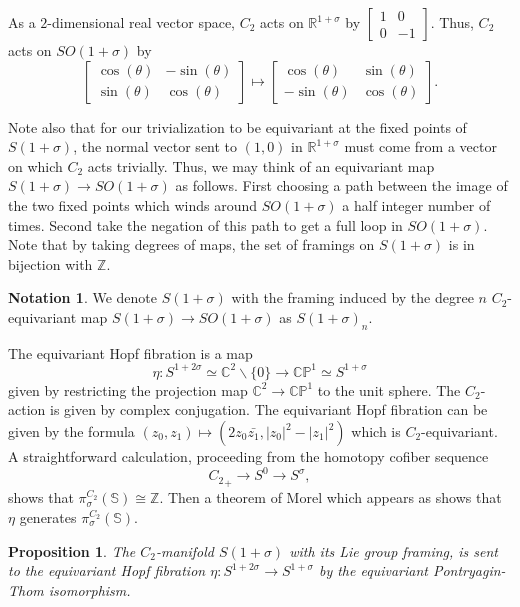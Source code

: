 \documentclass[11pt]{amsart}
\newcommand{\R}{\mathbb R}
\newcommand{\C}{\mathbb C}
\newcommand{\Z}{\mathbb{Z}}
\newcommand{\Sph}{\mathbb{S}}
\theoremstyle{plain}   %
\newtheorem{prop}[thm]{Proposition}
\theoremstyle{definition}
\newtheorem{notn}[thm]{Notation}
\theoremstyle{remark}
\numberwithin{equation}{section}
\begin{document}
As a $2$-dimensional real vector space, $C_2$ acts on $\R^{1+\sigma}$ by $\begin{bmatrix}
1&0\\0&-1
\end{bmatrix}$. Thus, $C_2$ acts on $SO(1+\sigma)$ by 
\[
\begin{bmatrix}
\cos(\theta)&-\sin(\theta)\\\sin(\theta)&\cos(\theta)
\end{bmatrix}\mapsto \begin{bmatrix}\cos(\theta) &\sin(\theta)\\
-\sin(\theta) & \cos(\theta)
\end{bmatrix}.
\]

Note also that for our trivialization to be equivariant at the fixed points of $S(1+\sigma)$, the normal vector sent to $(1,0)$ in $\R^{1+\sigma}$ must come from a vector on which $C_2$ acts trivially. Thus, we may think of an equivariant map $S(1+\sigma)\to SO(1+\sigma)$ as follows. First choosing a path between the image of the two fixed points which winds around $SO(1+\sigma)$ a half integer number of times. Second take the negation of this path to get a full loop in $SO(1+\sigma)$. Note that by taking degrees of maps, the set of framings on $S(1+\sigma)$ is in bijection with $\Z$. 

\begin{notn}
We denote $S(1+\sigma)$ with the framing induced by the degree $n$ $C_2$-equivariant map $S(1+\sigma)\to SO(1+\sigma)$ as $S(1+\sigma)_n$.
\end{notn}

The equivariant Hopf fibration is a map 
\[
\eta\colon S^{1+2\sigma} \simeq \C^2\backslash \{0\} \rightarrow \mathbb{CP}^1\simeq S^{1+\sigma} 
\] 
given by restricting the projection map $\C^2\to \mathbb{CP}^1$ to the unit sphere. The $C_2$-action is given by complex conjugation. The equivariant Hopf fibration can be given by the formula $(z_0,z_1)\mapsto (2z_0\bar{z_1},|z_0|^2-|z_1|^2)$ which is $C_2$-equivariant. A straightforward calculation, proceeding from the homotopy cofiber sequence
\[
{C_2}_+\to S^0\to S^\sigma,
\] 
shows that $\pi_\sigma^{C_2}(\Sph)\cong \Z$. Then a theorem of Morel \cite{morel} which appears as \cite[Theorem 1.2]{dugger_isaksen} shows that $\eta$ generates $\pi_\sigma^{C_2}(\Sph)$. 

\begin{prop}
The $C_2$-manifold $S(1+\sigma)$ with its Lie group framing, is sent to the equivariant Hopf fibration $\eta\colon S^{1+2\sigma}\to S^{1+\sigma}$ by the equivariant Pontryagin-Thom isomorphism. 
\end{prop}
\end{document}
